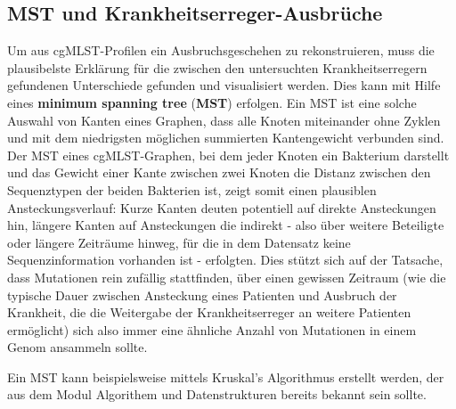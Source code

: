 \subsection{MST und Krankheitserreger-Ausbrüche}

Um aus cgMLST-Profilen ein Ausbruchsgeschehen zu rekonstruieren, muss die plausibelste Erklärung für die zwischen den untersuchten Krankheitserregern gefundenen Unterschiede gefunden und visualisiert werden. Dies kann mit Hilfe eines \textbf{minimum spanning tree} (\textbf{MST}) erfolgen. Ein MST ist eine solche Auswahl von Kanten eines Graphen, dass alle Knoten miteinander ohne Zyklen und mit dem niedrigsten möglichen summierten Kantengewicht verbunden sind. Der MST eines cgMLST-Graphen, bei dem jeder Knoten ein Bakterium darstellt und das Gewicht einer Kante zwischen zwei Knoten die Distanz zwischen den Sequenztypen der beiden Bakterien ist, zeigt somit einen plausiblen Ansteckungsverlauf: Kurze Kanten deuten potentiell auf direkte Ansteckungen hin, längere Kanten auf Ansteckungen die indirekt - also über weitere Beteiligte oder längere Zeiträume hinweg, für die in dem Datensatz keine Sequenzinformation vorhanden ist - erfolgten. Dies stützt sich auf der Tatsache, dass Mutationen rein zufällig stattfinden, über einen gewissen Zeitraum (wie die typische Dauer zwischen Ansteckung eines Patienten und Ausbruch der Krankheit, die die Weitergabe der Krankheitserreger an weitere Patienten ermöglicht) sich also immer eine ähnliche Anzahl von Mutationen in einem Genom ansammeln sollte. 

Ein MST kann beispielsweise mittels Kruskal's Algorithmus erstellt werden, der aus dem Modul Algorithem und Datenstrukturen bereits bekannt sein sollte. 
